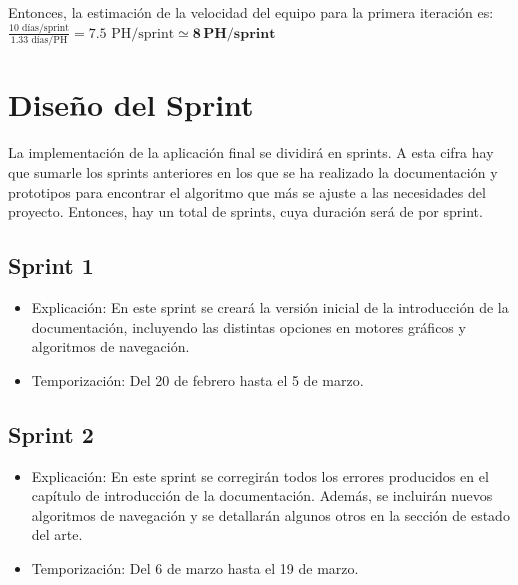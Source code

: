 \bigskip

Entonces, la estimación de la velocidad del equipo para la primera iteración es: $\frac{10 \text{ días/sprint}}{1.33 \text{ días/PH}} = 7.5 \text{ PH/sprint} \simeq \mathbf{8\,PH/sprint}$

\section{Diseño del Sprint}


La implementación de la aplicación final se dividirá en \sprintNro sprints. A esta cifra hay que sumarle los \docSprints sprints anteriores en los que se ha realizado la documentación y prototipos para encontrar el algoritmo que más se ajuste a las necesidades del proyecto. Entonces, hay un total de \totalSprints sprints, cuya duración será de \sprintLength por sprint.

\subsection{Sprint 1}
\begin{itemize}
    \item Explicación: En este sprint se creará la versión inicial de la introducción de la documentación, incluyendo las distintas opciones en motores gráficos y algoritmos de navegación.

    \item Temporización: Del 20 de febrero hasta el 5 de marzo.
\end{itemize}

\subsection{Sprint 2}
\begin{itemize}
    \item Explicación: En este sprint se corregirán todos los errores producidos en el capítulo de introducción de la documentación. Además, se incluirán nuevos algoritmos de navegación y se detallarán algunos otros en la sección de estado del arte.
    \item Temporización: Del 6 de marzo hasta el 19 de marzo. 
\end{itemize}

